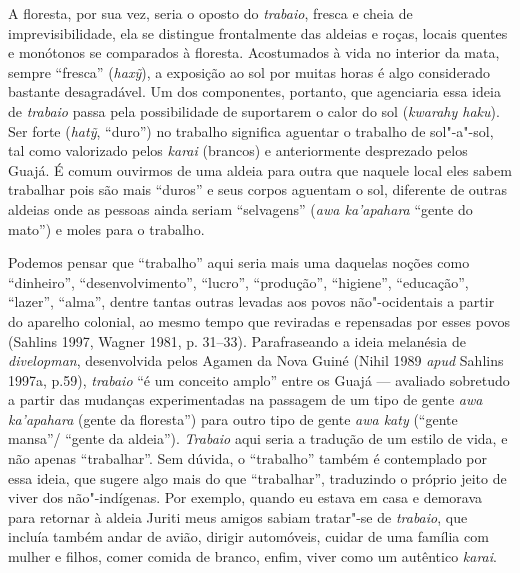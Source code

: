 A floresta, por sua vez, seria o oposto do \emph{trabaio}, fresca e
cheia de imprevisibilidade, ela se distingue frontalmente das aldeias e
roças, locais quentes e monótonos se comparados à floresta. Acostumados
à vida no interior da mata, sempre ``fresca'' (\emph{haxỹ}), a
exposição ao sol por muitas horas é algo considerado bastante
desagradável. Um dos componentes, portanto, que agenciaria essa ideia de
\emph{trabaio} passa pela possibilidade de suportarem o calor do sol
(\emph{kwarahy haku}). Ser forte (\emph{hatỹ}, ``duro'') no trabalho
significa aguentar o trabalho de sol"-a"-sol, tal como valorizado pelos
\emph{karai} (brancos) e anteriormente desprezado pelos Guajá. É comum
ouvirmos de uma aldeia para outra que naquele local eles sabem trabalhar
pois são mais ``duros'' e seus corpos aguentam o sol, diferente de
outras aldeias onde as pessoas ainda seriam ``selvagens'' (\emph{awa
ka'apahara} ``gente do mato'') e moles para o trabalho.

Podemos pensar que ``trabalho'' aqui seria mais uma daquelas noções como
``dinheiro'', ``desenvolvimento'', ``lucro'', ``produção'', ``higiene'',
``educação'', ``lazer'', ``alma'', dentre tantas outras levadas aos
povos não"-ocidentais a partir do aparelho colonial, ao mesmo tempo que
reviradas e repensadas por esses povos (Sahlins 1997, Wagner 1981, p.
31--33). Parafraseando a ideia melanésia de \emph{divelopman},
desenvolvida pelos Agamen da Nova Guiné (Nihil 1989 \emph{apud} Sahlins 1997a,
p.59), \emph{trabaio} ``é um conceito amplo'' entre os Guajá --- avaliado
sobretudo a partir das mudanças experimentadas na passagem de um tipo de
gente \emph{awa ka'apahara} (gente da floresta'') para outro tipo de
gente \emph{awa katy} (``gente mansa''/ ``gente da aldeia'').
\emph{Trabaio} aqui seria a tradução de um estilo de vida, e não apenas
``trabalhar''. Sem dúvida, o ``trabalho'' também é contemplado por essa
ideia, que sugere algo mais do que ``trabalhar'', traduzindo o próprio
jeito de viver dos não"-indígenas. Por exemplo, quando eu estava em casa
e demorava para retornar à aldeia Juriti meus amigos sabiam tratar"-se de
\emph{trabaio}, que incluía também andar de avião, dirigir automóveis,
cuidar de uma família com mulher e filhos, comer comida de branco,
enfim, viver como um autêntico \emph{karai}.

